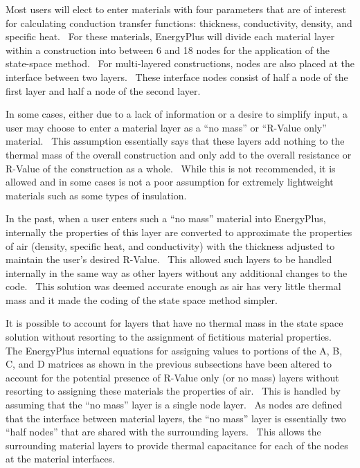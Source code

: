 Most users will elect to enter materials with four parameters that are of interest for calculating conduction transfer functions: thickness, conductivity, density, and specific heat.~ For these materials, EnergyPlus will divide each material layer within a construction into between 6 and 18 nodes for the application of the state-space method.~ For multi-layered constructions, nodes are also placed at the interface between two layers.~ These interface nodes consist of half a node of the first layer and half a node of the second layer.

In some cases, either due to a lack of information or a desire to simplify input, a user may choose to enter a material layer as a ``no mass'' or ``R-Value only'' material.~ This assumption essentially says that these layers add nothing to the thermal mass of the overall construction and only add to the overall resistance or R-Value of the construction as a whole.~ While this is not recommended, it is allowed and in some cases is not a poor assumption for extremely lightweight materials such as some types of insulation.

In the past, when a user enters such a ``no mass'' material into EnergyPlus, internally the properties of this layer are converted to approximate the properties of air (density, specific heat, and conductivity) with the thickness adjusted to maintain the user's desired R-Value.~ This allowed such layers to be handled internally in the same way as other layers without any additional changes to the code.~ This solution was deemed accurate enough as air has very little thermal mass and it made the coding of the state space method simpler.

It is possible to account for layers that have no thermal mass in the state space solution without resorting to the assignment of fictitious material properties.~ The EnergyPlus internal equations for assigning values to portions of the A, B, C, and D matrices as shown in the previous subsections have been altered to account for the potential presence of R-Value only (or no mass) layers without resorting to assigning these materials the properties of air.~ This is handled by assuming that the ``no mass'' layer is a single node layer.~ As nodes are defined that the interface between material layers, the ``no mass'' layer is essentially two ``half nodes'' that are shared with the surrounding layers.~ This allows the surrounding material layers to provide thermal capacitance for each of the nodes at the material interfaces.

